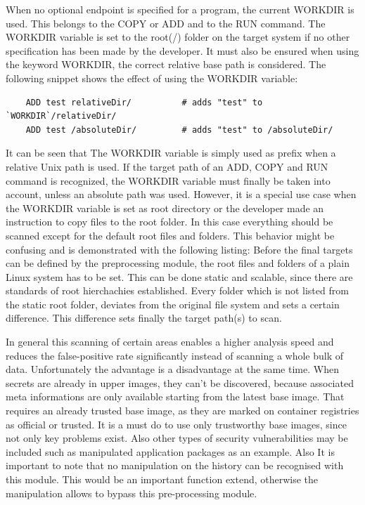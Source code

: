 When no optional endpoint is specified for a program, the current WORKDIR is used. This belongs to the COPY or ADD and to the RUN command.
The WORKDIR variable is set to the root(/) folder on the target system if no other specification has been made by the developer. 
It must also be ensured when using the keyword WORKDIR, the correct relative base path is considered. 
The following snippet shows the effect of using the WORKDIR variable:
\begin{lstlisting}
	ADD test relativeDir/          # adds "test" to `WORKDIR`/relativeDir/
	ADD test /absoluteDir/         # adds "test" to /absoluteDir/
\end{lstlisting}
It can be seen that The WORKDIR variable is simply used as prefix when a relative Unix path is used.
If the target path of an ADD, COPY and RUN command is recognized, the WORKDIR variable must finally be taken into account, unless an absolute path was used.
However, it is a special use case when the WORKDIR variable is set as root directory or the developer made an instruction to copy files to the root folder. In this case everything should be scanned except for the default root files and folders.
This behavior might be confusing and is demonstrated with the following listing:
Before the final targets can be defined by the preprocessing module, the root files and folders of a plain Linux system has to be set. This can be done static and scalable, since there are standards of root hierchachies established. Every folder which is not listed from the static root folder, deviates from the original file system and sets a certain difference. This difference sets finally the target path(s) to scan. 

In general this scanning of certain areas enables a higher analysis speed and reduces the false-positive rate significantly instead of scanning a whole bulk of data. Unfortunately the advantage is a disadvantage at the same time. When secrets are already in upper images, they can't be discovered, because associated meta informations are only available starting from the latest base image. That requires an already trusted base image, as they are marked on container registries as official or trusted. It is a must do to use only trustworthy base images, since not only key problems exist. Also other types of security vulnerabilities may be included such as manipulated application packages as an example. 
Also It is important to note that no manipulation on the history can be recognised with this module. This would be an important function extend, otherwise the manipulation allows to bypass this pre-processing module. 

